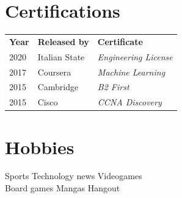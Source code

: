 \documentclass[]{deedy-resume-openfont}
\begin{document}
\begin{minipage}[t]{0.33\textwidth}
\section{Certifications}
\begin{tabular}{@{}lll@{}}
\textbf{Year} & \textbf{Released by} & \textbf{Certificate} \\
2020          & Italian State & \textit{Engineering License}\\
2017          & Coursera      & \textit{Machine Learning} \\
2015	      & Cambridge     & \textit{B2 First} \\
2015	      & Cisco         & \textit{CCNA Discovery} \\
\end{tabular}
\sectionsep


\section{Hobbies}
Sports \textbullet{} Technology news \textbullet{} Videogames \\
Board games \textbullet{} Mangas \textbullet{} Hangout

%
%

\end{minipage}
\hfill
\end{document}
